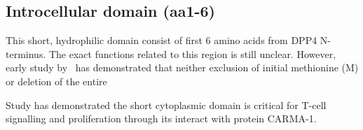 \subsection{Introcellular domain (aa1-6)}

This short, hydrophilic domain consist of first 6 amino acids from DPP4 N-terminus. The exact functions related to this region is still unclear. However, early study by~\citet{Hong1990} has demonstrated that neither exclusion of initial methionine (M) or deletion of the entire 

Study has demonstrated the short cytoplasmic domain is critical for T-cell signalling and proliferation through its interact with protein CARMA-1. \cite{Ohnuma_2007}
